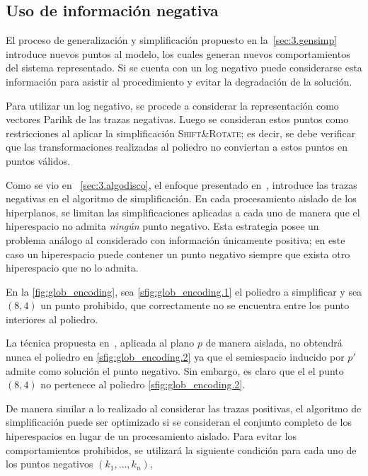 \subsection{Uso de información negativa}
\label{sec:3.gensimp negative}

El proceso de generalización y simplificación propuesto en la~\autoref{sec:3.gensimp} introduce nuevos puntos al modelo, 
los cuales generan nuevos comportamientos del sistema representado. Si se cuenta con un log negativo
puede considerarse esta información para asistir al procedimiento y evitar la degradación
de la solución.

Para utilizar un log negativo, se procede a considerar la representación como vectores Parihk de las trazas negativas.
Luego se consideran estos puntos como restricciones al aplicar la simplificación \textsc{Shift\&Rotate}; es decir, se debe 
verificar que las transformaciones realizadas al poliedro no conviertan a estos puntos en puntos válidos.

Como se vio en ~\autoref{sec:3.algodisco}, el enfoque presentado en~\cite{LeonCB15},
introduce las trazas negativas en el algoritmo de simplificación.
En cada procesamiento aislado de los hiperplanos, se limitan las simplificaciones 
aplicadas a cada uno de manera que el hiperespacio no admita \emph{ningún} punto negativo.
Esta estrategia posee un problema análogo al considerado con información únicamente positiva; en este caso
un hiperespacio puede contener un punto negativo siempre que exista otro hiperespacio
que no lo admita.

\begin{example}
    En la \autoref{fig:glob_encoding}, sea \autoref{sfig:glob_encoding.1} el poliedro
    a simplificar y sea $(8,4)$ un punto prohibido, que correctamente no se encuentra entre los
    punto interiores al poliedro.
    
    La técnica propuesta en~\cite{LeonCB15}, aplicada al plano $p$ de manera aislada, 
    no obtendrá nunca el poliedro en \autoref{sfig:glob_encoding.2} ya que
    el semiespacio inducido por $p'$ admite como solución el punto negativo. Sin embargo, es claro que el
    el punto $(8,4)$ no pertenece al poliedro \autoref{sfig:glob_encoding.2}.
\end{example}

De manera similar a lo realizado al considerar las trazas positivas, el algoritmo de simplificación
puede ser optimizado si se consideran el conjunto completo de los hiperespacios en lugar de un
procesamiento aislado. 
Para evitar los comportamientos prohibidos, se utilizará la siguiente condición para cada 
uno de los puntos negativos $(k_1,\dots,k_n)$,

